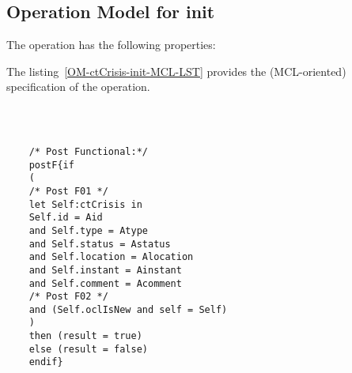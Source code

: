 \subsection{Operation Model for init}

\label{OM-init}


The  operation has the following properties:

	\begin{operationmodel}



		


	\end{operationmodel}



	\vspace{1cm}
	The listing~\ref{OM-ctCrisis-init-MCL-LST} provides the \msrmessir (MCL-oriented) specification of the operation.
	
	\scriptsize
	\vspace{0.5cm}
	\begin{lstlisting}[style=MessirStyle,firstnumber=auto,captionpos=b,caption={\msrmessir (MCL-oriented) specification of the operation \emph{init}.},label=OM-ctCrisis-init-MCL-LST]

	
	
	/* Post Functional:*/ 
	postF{if
	(
	/* Post F01 */
	let Self:ctCrisis in
	Self.id = Aid
	and Self.type = Atype
	and Self.status = Astatus
	and Self.location = Alocation
	and Self.instant = Ainstant
	and Self.comment = Acomment
	/* Post F02 */
	and (Self.oclIsNew and self = Self)
	)
	then (result = true)
	else (result = false)
	endif}
	
	
	\end{lstlisting}
	\normalsize 
	
	
	
	





